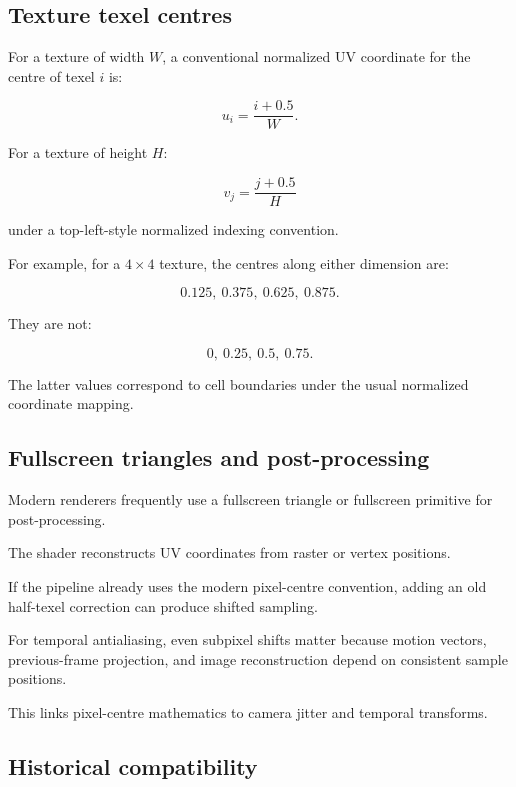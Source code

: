 \subsection{Texture texel centres}\label{02-foundations-ii-ch033-texture-texel-centres}

For a texture of width \(W\), a conventional normalized UV coordinate for the centre of texel \(i\) is:

\[
 \boxed{ u_i=\frac{i+0.5}{W} }.
\]

For a texture of height \(H\):

\[
 \boxed{ v_j=\frac{j+0.5}{H} }
\]

under a top-left-style normalized indexing convention.

For example, for a \(4\times4\) texture, the centres along either dimension are:

\[
 \boxed{ 0.125,\ 0.375,\ 0.625,\ 0.875 }.
\]

They are not:

\[
 0,\ 0.25,\ 0.5,\ 0.75.
\]

The latter values correspond to cell boundaries under the usual normalized coordinate mapping.

\subsection{Fullscreen triangles and post-processing}\label{02-foundations-ii-ch033-fullscreen-triangles-and-post-processing}

Modern renderers frequently use a fullscreen triangle or fullscreen primitive for post-processing.

The shader reconstructs UV coordinates from raster or vertex positions.

If the pipeline already uses the modern pixel-centre convention, adding an old half-texel correction can produce shifted sampling.

For temporal antialiasing, even subpixel shifts matter because motion vectors, previous-frame projection, and image reconstruction depend on consistent sample positions.

This links pixel-centre mathematics to camera jitter and temporal transforms.

\subsection{Historical compatibility}\label{02-foundations-ii-ch033-historical-compatibility}

